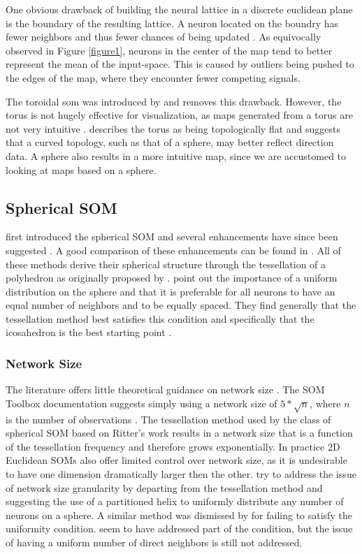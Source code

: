 \documentclass[12pt]{article}
\begin{document}
One obvious drawback of building the neural lattice in a discrete euclidean 
plane is the boundary of the resulting lattice.  A neuron located on the boundry has 
fewer neighbors and thus fewer chances of being updated \citep{Wu:2006lr}.  
As equivocally observed in Figure \ref{figure1}, neurons in the center of the 
map tend to better represent the mean of the input-space.  This is caused 
by outliers being pushed to the edges of the map, where they encounter fewer 
competing signals.

The toroidal som was introduced by \cite{li1993} and removes this drawback.
However, the torus is not hugely effective for visualization, as maps generated from 
a torus are not very intuitive \citep{ito2000,Wu:2006lr}.  \cite{ritter99} describes 
the torus as being topologically flat and suggests that a curved topology, such 
as that of a sphere, may better reflect direction data.  A sphere also results in a 
more intuitive map, since we are accustomed to looking at maps based on a sphere.

\subsection{Spherical SOM}
\cite{ritter99} first introduced the spherical SOM and several
enhancements have since been suggested 
\citep{Wu:2006lr,boudjemai2003,sangole03,Nishio:2006fk}.  A good
comparison of these enhancements can be found in \citep{Wu:2006lr}.  All of
these methods derive their spherical structure through the tessellation of a
polyhedron as originally proposed by \citeauthor{ritter99}.  \cite{Wu:2006lr}
point out the importance of a uniform distribution on the sphere and that it is
preferable for all neurons to have an equal number of neighbors and to be
equally spaced.  They find generally that the tessellation method best
satisfies this condition and specifically that the icosahedron is the best
starting point \citep{wu2005}.

\subsubsection{Network Size}
The literature offers little theoretical guidance on network size \citep{cho1996}. 
The SOM Toolbox documentation suggests simply using a network size 
of \(5*\sqrt {n}\), where \(n\) is the number of observations \citep{toolbox}.
The tessellation method used by the class of spherical SOM based on Ritter's
work results in a network size that is a function of the tessellation frequency
and therefore grows exponentially. In practice 2D Euclidean SOMs
also offer limited control over network size, as it is undesirable to have one
dimension dramatically larger then the other.  
\cite{Nishio:2006fk} try to address the issue of network size granularity by departing 
from the tessellation method and suggesting the use of a partitioned helix to uniformly distribute any
number of neurons on a sphere.  A similar method was dismissed by
\cite{wu2005} for failing to satisfy the uniformity condition.
\citeauthor{Nishio:2006fk} seem to have addressed part of the condition, but the
issue of having a uniform number of direct neighbors is still not addressed.
\end{document}
